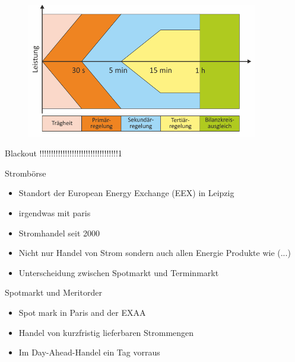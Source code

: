 \documentclass[aspectratio=1610, professionalfonts, 9pt]{beamer}
\begin{document}
{
\begin{frame}
  \begin{figure}
  \includegraphics[width=0.9\textwidth]{images/Regelleistung.png}
\end{figure}
\end{frame}
}

\begin{frame}{Blackout}
!!!!!!!!!!!!!!!!!!!!!!!!!!!!!!!!!!1
\end{frame}

\begin{frame}{Strombörse}
\begin{itemize}
  \item Standort der European Energy Exchange (EEX) in Leipzig
\item irgendwas mit paris
  \item Stromhandel seit \num{2000}
  \item Nicht nur Handel von Strom sondern auch allen Energie Produkte wie (...)
  \item Unterscheidung zwischen Spotmarkt und Terminmarkt
\end{itemize}
\end{frame}

\begin{frame}{Spotmarkt und Meritorder}
\begin{itemize}
\item Spot mark in Paris and der EXAA
\item Handel von kurzfristig lieferbaren Strommengen
\item Im Day-Ahead-Handel ein Tag vorraus
\end{itemize}
\end{frame}
\end{document}
